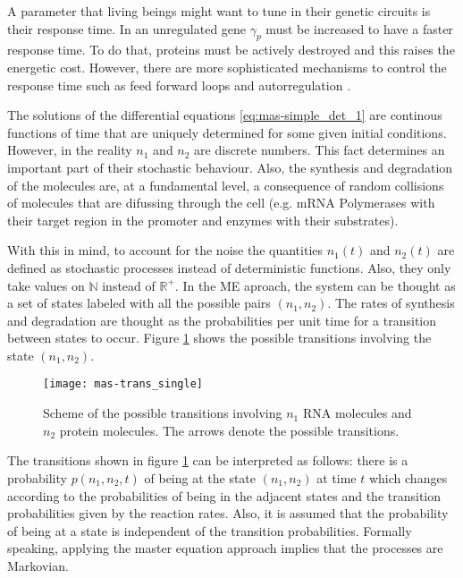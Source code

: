 A parameter that living beings might want to tune in their genetic circuits is their response time. In an unregulated gene $\gamma_p$ must be increased to have a faster response time. To do that, proteins must be actively destroyed and this raises the energetic cost. However, there are more sophisticated mechanisms to control the response time such as feed forward loops and autorregulation \cite{alon06}.

The solutions of the differential equations \eqref{eq:mas-simple_det_1} are continous functions of time that are uniquely determined for some given initial conditions. However, in the reality $n_1$ and $n_2$ are discrete numbers. This fact determines an important part of their stochastic behaviour. Also, the synthesis and degradation of the molecules are, at a fundamental level, a consequence of random collisions of molecules that are difussing through the cell (e.g. mRNA Polymerases with their target region in the promoter and enzymes with their substrates).

With this in mind, to account for the noise the quantities $n_1(t)$ and $n_2(t)$ are defined as stochastic processes instead of deterministic functions. Also, they only take values on $\mathbb{N}$ instead of $\mathbb{R}^+$. In the ME aproach, the system can be thought as a set of states labeled with all the possible pairs $(n_1,n_2)$. The rates of synthesis and degradation are thought as the probabilities per unit time for a transition between states to occur. Figure \ref{fig:mas-trans_single} shows the possible transitions involving the state $(n_1,n_2)$.
\begin{figure}[H]
  \centering
  \texttt{[image: mas-trans\_single]}
  \caption[Transitions between states for a single gene]{\label{fig:mas-trans_single} Scheme of the possible transitions involving $n_1$ RNA molecules and $n_2$ protein molecules. The arrows denote the possible transitions.}
\end{figure}

The transitions shown in figure \ref{fig:mas-trans_single} can be interpreted as follows: there is a probability $p(n_1,n_2,t)$ of being at the state $(n_1,n_2)$ at time $t$ which changes according to the probabilities of being in the adjacent states and the transition probabilities given by the reaction rates. Also, it is assumed that the probability of being at a state is independent of the transition probabilities. Formally speaking, applying the master equation approach implies that the processes are Markovian.

